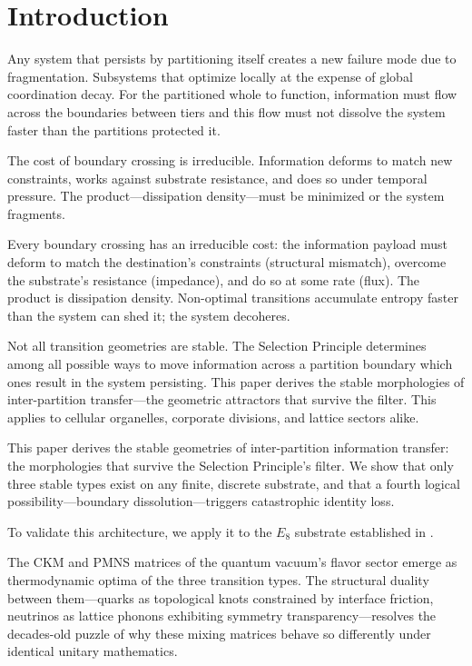 
\section{Introduction}

Any system that persists by partitioning itself creates a new failure mode due to fragmentation. Subsystems that optimize locally at the expense of global coordination decay. For the partitioned whole to function, information must flow across the boundaries between tiers and this flow must not dissolve the system faster than the partitions protected it.

The cost of boundary crossing is irreducible. Information deforms to match new constraints, works against substrate resistance, and does so under temporal pressure. The product—dissipation density—must be minimized or the system fragments. 

Every boundary crossing has an irreducible cost: the information payload must deform to match the destination's constraints (structural mismatch), overcome the substrate's resistance (impedance), and do so at some rate (flux). The product is dissipation density. Non-optimal transitions accumulate entropy faster than the system can shed it; the system decoheres.

Not all transition geometries are stable. The Selection Principle determines among all possible ways to move information across a partition boundary which ones result in the system persisting. This paper derives the stable morphologies of inter-partition transfer—the geometric attractors that survive the filter.  This applies to cellular organelles, corporate divisions, and lattice sectors alike.

This paper derives the stable geometries of inter-partition information transfer: the morphologies that survive the Selection Principle's filter. We show that only three stable types exist on any finite, discrete substrate, and that a fourth logical possibility—boundary dissolution—triggers catastrophic identity loss.

To validate this architecture, we apply it to the $E_8$ substrate established in \cite{meyer_informational_2026, meyer_ieaction_2026}.

The CKM and PMNS matrices of the quantum vacuum's flavor sector emerge as thermodynamic optima of the three transition types. The structural duality between them—quarks as topological knots constrained by interface friction, neutrinos as lattice phonons exhibiting symmetry transparency—resolves the decades-old puzzle of why these mixing matrices behave so differently under identical unitary mathematics.

